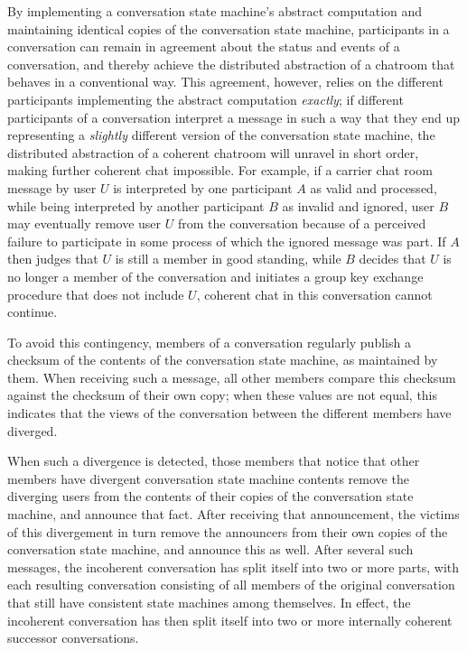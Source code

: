 \documentclass{article}
\begin{document}
By implementing a conversation state machine's abstract computation and maintaining identical copies of the conversation state machine, participants in a conversation can remain in agreement about the status and events of a conversation, and thereby achieve the distributed abstraction of a chatroom that behaves in a conventional way.
This agreement, however, relies on the different participants implementing the abstract computation \emph{exactly}; if different participants of a conversation interpret a message in such a way that they end up representing a \emph{slightly} different version of the conversation state machine, the distributed abstraction of a coherent chatroom will unravel in short order, making further coherent chat impossible.
For example, if a carrier chat room message by user $U$ is interpreted by one participant $A$ as valid and processed, while being interpreted by another participant $B$ as invalid and ignored, user $B$ may eventually remove user $U$ from the conversation because of a perceived failure to participate in some process of which the ignored message was part.
If $A$ then judges that $U$ is still a member in good standing, while $B$ decides that $U$ is no longer a member of the conversation and initiates a group key exchange procedure that does not include $U$, coherent chat in this conversation cannot continue.

To avoid this contingency, members of a conversation regularly publish a checksum of the contents of the conversation state machine, as maintained by them.
When receiving such a message, all other members compare this checksum against the checksum of their own copy; when these values are not equal, this indicates that the views of the conversation between the different members have diverged.

When such a divergence is detected, those members that notice that other members have divergent conversation state machine contents remove the diverging users from the contents of their copies of the conversation state machine, and announce that fact.
After receiving that announcement, the victims of this divergement in turn remove the announcers from their own copies of the conversation state machine, and announce this as well.
After several such messages, the incoherent conversation has split itself into two or more parts, with each resulting conversation consisting of all members of the original conversation that still have consistent state machines among themselves.
In effect, the incoherent conversation has then split itself into two or more internally coherent successor conversations.
\end{document}
